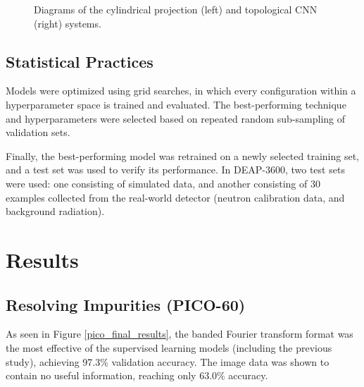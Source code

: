 \documentclass[12pt]{article}
\begin{document}
\begin{figure}[ht]
    \centering
    \qquad
    \caption{\label{deap_methods} Diagrams of the cylindrical projection (left) and topological CNN (right) systems.}
\end{figure}

\subsection{Statistical Practices}

Models were optimized using grid searches, in which every configuration within a hyperparameter space is trained and evaluated. The best-performing technique and hyperparameters were selected based on repeated random sub-sampling of validation sets.

Finally, the best-performing model was retrained on a newly selected training set, and a test set was used to verify its performance. In DEAP-3600, two test sets were used: one consisting of simulated data, and another consisting of 30 examples collected from the real-world detector (neutron calibration data, and background radiation).

\section{Results}

\subsection{Resolving Impurities (PICO-60)}

As seen in Figure \ref{pico_final_results}, the banded Fourier transform format was the most effective of the supervised learning models (including the previous study), achieving 97.3\% validation accuracy. The image data was shown to contain no useful information, reaching only 63.0\% accuracy.
\end{document}
